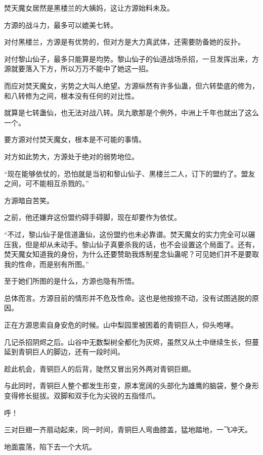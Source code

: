 
\begin{this_body}

焚天魔女居然是黑楼兰的大姨妈，这让方源始料未及。

方源的战斗力，最多可以媲美七转。

对付黑楼兰，方源是有优势的，但对方是大力真武体，还需要防备她的反扑。

对付黎山仙子，最多只能算是均势。黎山仙子的仙道战场杀招，一旦发挥出来，方源就要落入下方，所以万万不能中了她这一招。

而应对焚天魔女，劣势之大叫人绝望。方源纵然有许多仙蛊，但六转垫底的修为，和八转修为之间，根本没有任何的对比性。

就算是七转蛊仙，也无法对战八转。凤九歌那是个例外，中洲上千年也就出了这么一个。

要方源对付焚天魔女，根本是不可能的事情。

对方如此势大，方源处于绝对的弱势地位。

“现在能够依仗的，恐怕就是当初和黎山仙子、黑楼兰二人，订下的盟约了。盟友之间，可不能相互杀戮的。”

方源暗自苦笑。

之前，他还嫌弃这份盟约碍手碍脚，现在却要作为依仗。

“不过，黎山仙子是信道蛊仙，这份盟约也未必靠谱。焚天魔女的实力完全可以碾压我，但是却从未动手。黎山仙子真要杀我的话，也不会设置这个局面了。还有，焚天魔女知道我的身份，为什么还要赞助我炼制星念仙蛊呢？可见她们并不是要取我的性命，而是别有所图。”

至于她们所图的是什么，方源也隐有所悟。

总体而言。方源目前的情形并不危及性命。这也是他按捺不动，没有试图逃脱的原因。

正在方源思索自身安危的时候。山中梨园里被困着的青铜巨人，仰头咆哮。

几记杀招阴烬之后。山谷中无数梨树全都化为灰烬，虽然又从土中继续生长，但蔓延到青铜巨人的脚边，还有一段时间。

趁此机会，青铜巨人的后背，陡然又冒出另外两对青铜巨翅。

与此同时，青铜巨人整个都发生形变，原本宽阔的头部化为雄鹰的脑袋，整个身形变得修长挺拔。双脚和双手化为尖锐的五指怪爪。

呼！

三对巨翅一齐扇动起来，同一时间，青铜巨人弯曲膝盖，猛地踏地，一飞冲天。

地面震荡，陷下去一个大坑。


\end{this_body}
